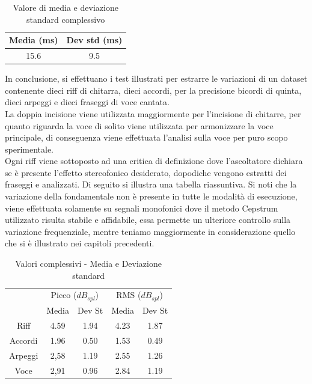 \documentclass[12pt]{report}
\begin{document}
\begin{table}[htbp]
\begin{center}
\begin{tabular}{|c|c|}
\hline
Media (ms) & Dev std (ms)\\
\hline
15.6 & 9.5\\
\hline
\end{tabular}
\end{center}
\caption{Valore di media e deviazione standard complessivo}
\label{tab:rit}
\end{table}

\clearpage

In conclusione, si effettuano i test illustrati per estrarre le variazioni di un dataset contenente dieci riff di chitarra, dieci accordi, per la precisione bicordi di quinta, dieci arpeggi e dieci fraseggi di voce cantata.\\
La doppia incisione viene utilizzata maggiormente per l'incisione di chitarre, per quanto riguarda la voce di solito viene utilizzata per armonizzare la voce principale, di conseguenza viene effettuata l'analisi sulla voce per puro scopo sperimentale.\\

Ogni riff viene sottoposto ad una critica di definizione dove l'ascoltatore dichiara se è presente l'effetto stereofonico desiderato, dopodiche vengono estratti dei fraseggi e analizzati.
Di seguito si illustra una tabella riassuntiva.
Si noti che la variazione della fondamentale non è presente in tutte le modalità di esecuzione, viene effettuata solamente su segnali monofonici dove il metodo Cepstrum utilizzato risulta stabile e affidabile, essa permette un ulteriore controllo sulla variazione frequenziale, mentre teniamo maggiormente in considerazione quello che si è illustrato nei capitoli precedenti.

\begin{table}[htbp]
\begin{center}
\begin{tabular}{|c|c|c|c|c|}
\hline
 & \multicolumn{2}{|c|}{Picco ($dB_{spl}$)} & \multicolumn{2}{|c|}{RMS ($dB_{spl}$)}\\
 & Media & Dev St & Media & Dev St\\
\hline
Riff & 4.59 & 1.94 & 4.23 & 1.87\\
\hline
Accordi & 1.96 & 0.50 & 1.53 & 0.49\\
\hline
Arpeggi & 2,58 & 1.19 & 2.55 & 1.26\\
\hline
Voce & 2,91 & 0.96 & 2.84 & 1.19\\
\hline
\end{tabular}
\end{center}
\caption{Valori complessivi - Media e Deviazione standard}
\label{tab:uno}
\end{table}
\end{document}
